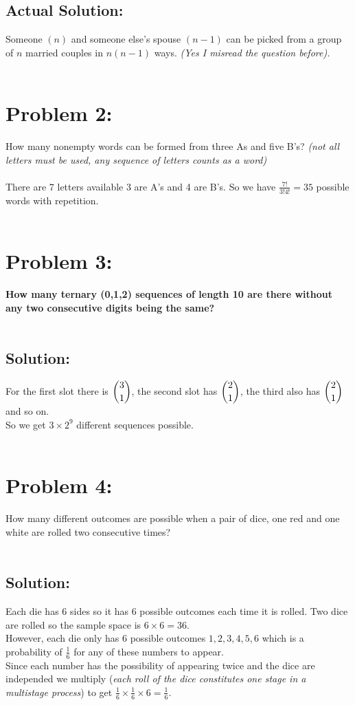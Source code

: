 \documentclass{article}
\begin{document}
\subsection*{Actual Solution: }
Someone $(n)$ and someone else's spouse $(n-1)$ can be picked from a group of $n$ married couples in $n(n-1)$ ways. \textit{(Yes I misread the question before).} 
\\ \\

\section*{Problem 2: }
How many nonempty words can be formed from three As and five B’s?
\textit{(not all letters must be used, any sequence of letters counts as a word)}
\\ \\
There are 7 letters available 3 are A's and 4 are B's.
So we have $\frac{7!}{3!4!} = 35$ possible words with repetition. 
\\ \\
\section*{Problem 3: }
\textbf{How many ternary (0,1,2) sequences of length 10 are there without any two consecutive digits being the same?}
\\ \\ 
\subsection*{Solution: }
For the first slot there is $\dbinom{3}{1}$, the second slot has $\dbinom{2}{1}$, the third also has $\dbinom{2}{1}$ and so on. \\
So we get $3 \times 2^{9}$ different sequences possible. 
\\ \\
\section*{Problem 4: }
How many different outcomes are possible when a pair of dice, one red and one white are rolled two consecutive times?
\\ \\
\subsection*{Solution: }
Each die has 6 sides so it has 6 possible outcomes each time it is rolled. Two dice are rolled so the sample space is $6 \times 6 = 36$.\\
However, each die only has 6 possible outcomes $1, 2, 3, 4, 5, 6$ which is a probability of $\frac{1}{6}$ for any of these numbers to appear. \\
Since each number has the possibility of appearing twice and the dice are independed we multiply (\textit{each roll of the dice constitutes one stage in a multistage process}) to get $\frac{1}{6} \times \frac{1}{6} \times 6 = \frac{1}{6}$.
\\ \\
\end{document}
